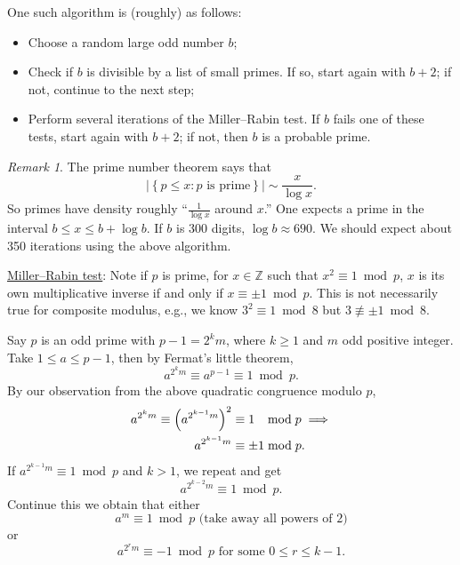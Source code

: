 \documentclass{amsbook}
\theoremstyle{plain}
\theoremstyle{definition}
\theoremstyle{remark}
\newtheorem{remark}[theorem]{Remark}
\numberwithin{equation}{chapter}
\numberwithin{figure}{chapter}
\newcommand{\Z}{\mathbb{Z}}
\begin{document}
One such algorithm is (roughly) as follows:
\begin{itemize}
\item Choose a random large odd number $b$;
\item Check if $b$ is divisible by a list of small primes. If so, start again with $b+2$; if not, continue to the next step;
\item Perform several iterations of the Miller--Rabin test. If $b$ fails one of these tests, start again with $b+2$; if not, then $b$ is a probable prime.
\end{itemize}
\begin{remark}
  The prime number theorem says that
  \[
    | \left\{ p \leqslant x : p \text{ is prime} \right\} | \sim \frac{x}{\log x}.
  \]
  So primes have density roughly ``$\frac{1}{\log x}$ around $x$.'' One expects a prime in the interval $b \leqslant x \leqslant b + \log b$. If $b$ is 300 digits, $\log b \approx 690$. We should expect about 350 iterations using the above algorithm.
\end{remark}
\underline{Miller--Rabin test}: Note if $p$ is prime, for $x \in \Z$ such that  $x^2 \equiv 1 \bmod p$, $x$ is its own multiplicative inverse if and only if $x \equiv \pm 1 \bmod p$. This is not necessarily true for composite modulus, e.g., we know $3^2 \equiv 1 \bmod 8$ but $3 \not\equiv \pm 1 \bmod 8$.

Say $p$ is an odd prime with $p - 1 = 2^km$, where $k \geqslant 1$ and $m$ odd positive integer. Take $1 \leqslant a \leqslant p - 1$, then by Fermat's little theorem,
\[
  a^{2^km} \equiv a^{p-1} \equiv 1 \bmod p.
\]
By our observation from the above quadratic congruence modulo $p$,
\begin{align}
  a^{2^km} \equiv \left( a^{2^{k-1}m} \right)^2 &\equiv 1 \hspace{2.7mm} \bmod p \implies \\
  a^{2^{k-1}m} &\equiv \pm 1 \bmod p.
\end{align}
If $a^{2^{k-1}m} \equiv 1 \bmod p$ and $k > 1$, we repeat and get 
\[
  a^{2^{k-2}m} \equiv 1 \bmod p.
\]
Continue this we obtain that either
\[
  a^m \equiv 1 \bmod p \text{ (take away all powers of 2)}
\]
or 
\[
  a^{2^rm} \equiv - 1 \bmod p \text{ for some $0 \leqslant r \leqslant k - 1$.}
\]
\end{document}
